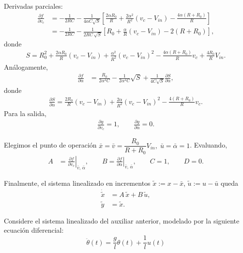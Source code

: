 \documentclass[
  11pt,
  letterpaper,
   addpoints,
   answers
  ]{exam}
\begin{document}
\begin{questions}
\begin{solution}
Derivadas parciales:
\begin{align}
\frac{\partial f}{\partial v_c}
&= -\frac{1}{2RC}
   - \frac{1}{4\alpha C \sqrt{S}}
      \left[\frac{2\alpha R_0}{R}
            + \frac{2\alpha^2}{R^2}(v_c-V_{in})
            - \frac{4\alpha (R+R_0)}{R}\right] \\
&= -\frac{1}{2RC}
   - \frac{1}{2RC\,\sqrt{S}}
      \left[R_0 + \frac{\alpha}{R}(v_c-V_{in}) - 2(R+R_0)\right],
\end{align}
donde
\begin{align}
S
= R_0^2 + \frac{2\alpha R_0}{R}(v_c - V_{in})
  + \frac{\alpha^2}{R^2}(v_c - V_{in})^2
  - \frac{4\alpha (R+R_0)}{R} v_c + \frac{4R_0}{R}V_{in}.
\end{align}
Análogamente,
\begin{align}
\frac{\partial f}{\partial \alpha}
&= \frac{R_0}{2\alpha^2 C}
   - \frac{1}{2\alpha^2 C}\sqrt{S}
   + \frac{1}{4C\sqrt{S}}
      \frac{\partial S}{\partial \alpha},
\end{align}
donde
\begin{align}
\frac{\partial S}{\partial \alpha}
= \frac{2 R_0}{R}(v_c - V_{in})
  + \frac{2\alpha}{R^2}(v_c - V_{in})^2
  - \frac{4 (R+R_0)}{R} v_c .
\end{align}
Para la salida,
\begin{align}
\frac{\partial g}{\partial v_c}=1, \qquad
\frac{\partial g}{\partial \alpha}=0.
\end{align}

Elegimos el punto de operación
\(
\bar x=\bar v = \dfrac{R_0}{R+R_0}V_{in},\;
\bar u=\bar\alpha=1
\).
Evaluando,
\begin{align}
A &= \left.\frac{\partial f}{\partial v_c}\right|_{\bar v,\,\bar\alpha}, \qquad
B = \left.\frac{\partial f}{\partial \alpha}\right|_{\bar v,\,\bar\alpha}, \qquad
C = 1,\qquad D=0.
\end{align}

Finalmente, el sistema linealizado en incrementos \(\tilde x:=x-\bar x\), \(\tilde u:=u-\bar u\) queda
\begin{align}
\dot{\tilde x} &= A\,\tilde x + B\,\tilde u, \\
\tilde y &= \tilde x.
\end{align}

\end{solution}


    \question Considere el sistema linealizado del auxiliar anterior, modelado por la siguiente ecuación diferencial:
    \begin{equation}
        \ddot{\theta}(t) = \frac{g}{l} \theta(t) + \frac{1}{l} u(t)
    \end{equation}


\end{questions}
\end{document}
